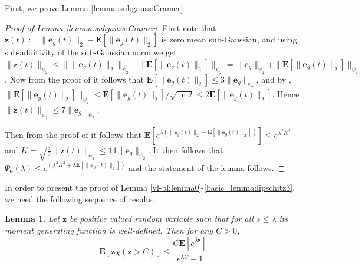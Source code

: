 \documentclass{article}
\def\rve{{\mathbf{e}}}
\newtheorem{lemma}[theorem]{Lemma}
\newcommand{\e}{\mathbf{e}}
\newcommand{\z}{\mathbf{z}}
\newcommand{\bE}{\mathbf{E}}
\begin{document}
First, we prove Lemma \ref{lemma:subgauss:Cramer}
\begin{proof}[Proof of Lemma \ref{lemma:subgauss:Cramer}]
  
  
  First note that $\z(t):=\|\e_g(t)\|_2 - \bE[\|\e_g(t)\|_2]$ is zero mean sub-Gaussian,
  and using sub-additivity of the sub-Gaussian norm we get $\|\z(t)\|_{\psi_2} \le \|\|\e_g(t)\|_2\|_{\psi_2}+ \|\bE[\|\e_g(t)\|_2]\|_{\psi_2}=\|\rve_g\|_{\psi_2}+ \|\bE[\|\e_g(t)\|_2]\|_{\psi_2}$. Now from the proof of \cite[Proposition 2.6.1]{vershynin2026highdimensional}
  it follows that $\bE[\|\e_g(t)\|_2] \le 3\|\e_g\|_{\psi_2}$, and by \cite[Exercise 2.24]{vershynin2026highdimensional},
  $\|\bE[\|\e_g(t)\|_2]\|_{\psi_2} \le \bE[\|\e_g(t)\|_2]/\sqrt{\ln 2} \le 2 \bE[\|\e_g(t)\|_2]$. Hence $\|\z(t)\|_{\psi_2} \le 7\|\rve_g\|_{\psi_2}$.  
  
  Then from the proof of
  \cite[Proposition 2.6.1]{vershynin2026highdimensional} it follows that 
  $\bE[e^{\lambda (\|\e_g(t)\|_2 - \bE[\|\e_g(t)\|_2])}] \le e^{\lambda^2 K^2}$ 
  and  $K=\sqrt{\frac{3}{2}} \|\z(t)\|_{\psi_2} \le 14 \|\rve_g\|_{\psi_2}$. It then follows that 
  $\Psi_{\e}(\lambda) \le e^{(\lambda^2 K^2+ \lambda \bE[\|\e_g(t)\|_2])}$ and
  the statement of the lemma follows. 
\end{proof}
In order to present the proof of Lemma \ref{vl-bl:lemma0}-\ref{basic_lemma:lipschitz3}, we need 
the following sequence of results.
\begin{lemma}
\label{noise:boundC-1}
  Let $\z$ be positive valued random variable such that for all $s \le \bar{\lambda}$
  its moment generating function is well-defined. Then for any $C > 0$,
  \[ \bE[\z \chi(\z > C)] \le \frac{C\bE[e^{\bar{\lambda} \z}]}{e^{\bar{\lambda} C}-1} \]
\end{lemma}
\end{document}
